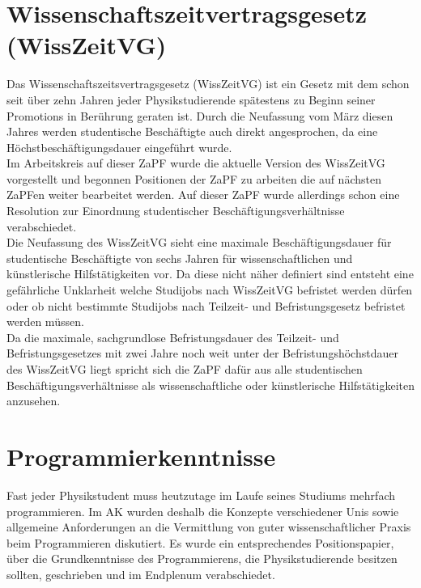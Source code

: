 \section*{Wissenschaftszeitvertragsgesetz (WissZeitVG)}

Das Wissenschaftszeitsvertragsgesetz (WissZeitVG) ist ein Gesetz mit dem schon seit über 
zehn Jahren jeder Physikstudierende spätestens zu Beginn seiner Promotions in Berührung geraten ist. 
Durch die Neufassung vom März diesen Jahres werden studentische Beschäftigte auch direkt angesprochen, 
da eine Höchstbeschäftigungsdauer eingeführt wurde.\\

Im Arbeitskreis auf dieser ZaPF wurde die aktuelle Version des WissZeitVG vorgestellt und 
begonnen Positionen der ZaPF zu arbeiten die auf nächsten ZaPFen weiter bearbeitet werden. 
Auf dieser ZaPF wurde allerdings schon eine Resolution zur Einordnung studentischer Beschäftigungsverhältnisse verabschiedet.\\

Die Neufassung des WissZeitVG sieht eine maximale Beschäftigungsdauer für studentische 
Beschäftigte von sechs Jahren für wissenschaftlichen und künstlerische Hilfstätigkeiten vor. 
Da diese nicht näher definiert sind entsteht eine gefährliche Unklarheit welche Studijobs nach 
WissZeitVG befristet werden dürfen oder ob nicht bestimmte Studijobs nach Teilzeit- und Befristungsgesetz befristet werden müssen.\\

Da die maximale, sachgrundlose Befristungsdauer des Teilzeit- und Befristungsgesetzes mit zwei 
Jahre noch weit unter der Befristungshöchstdauer des WissZeitVG liegt spricht sich die ZaPF 
dafür aus alle studentischen Beschäftigungsverhältnisse als wissenschaftliche oder künstlerische Hilfstätigkeiten anzusehen. \\

\section*{Programmierkenntnisse}
Fast jeder Physikstudent muss heutzutage im Laufe seines Studiums mehrfach programmieren. 
Im AK wurden deshalb die Konzepte verschiedener Unis sowie allgemeine Anforderungen an die 
Vermittlung von guter wissenschaftlicher Praxis beim Programmieren diskutiert. 
Es wurde ein entsprechendes Positionspapier, über die Grundkenntnisse des Programmierens, 
die Physikstudierende besitzen sollten, geschrieben und im Endplenum verabschiedet.

